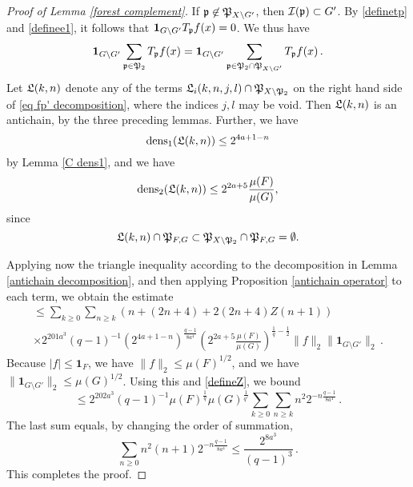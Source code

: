 {\begin{proof}[Proof of Lemma \ref{forest complement}]
    If $\mathfrak p \not\in \mathfrak P_{X \setminus G'}$, then $\mathcal{I}(\mathfrak p) \subset G'$. By \eqref{definetp} and \eqref{definee1}, it follows that
    $\mathbf{1}_{G \setminus G'} T_{\mathfrak p}f(x) = 0$. We thus have
    $$
        \mathbf{1}_{G\setminus G'} \sum_{\mathfrak p \in \mathfrak P_2} T_{\mathfrak p}f(x) = \mathbf{1}_{G\setminus G'} \sum_{\mathfrak p \in \mathfrak P_2 \cap \mathfrak P_{X \setminus G'}} T_{\mathfrak p}f(x)\,.
    $$
    Let $\mathfrak L(k,n)$ denote any of the terms $\mathfrak L_i(k,n,j,l) \cap \mathfrak P_{X \setminus \mathfrak P_2}$ on the right hand side of \eqref{eq fp' decomposition}, where the indices $j, l$ may be void. Then $\mathfrak L(k,n)$ is an antichain, by the three preceding lemmas. Further, we have
    \begin{equation*}
    \operatorname{\operatorname{dens}}_1(\mathfrak L(k,n)) \le 2^{4a+1 - n}
    \end{equation*}
    by Lemma \ref{C dens1}, and we have
    \begin{equation*}
     \operatorname{\operatorname{dens}}_2(\mathfrak L(k,n)) \le 2^{2a+5} \frac{\mu(F)}{\mu(G)},
     \end{equation*}
     since
     \begin{equation*}
     \mathfrak L(k,n) \cap \mathfrak P_{F,G} \subset \mathfrak P_{X \setminus \mathfrak P_2} \cap \mathfrak P_{F, G} = \emptyset.
     \end{equation*}

    Applying now the triangle inequality according to the decomposition in Lemma \ref{antichain decomposition}, and then applying Proposition \ref{antichain operator} to each term, we obtain the estimate
    \begin{multline*}
        \le \sum_{k \ge 0} \sum_{n \ge k} (n + (2n+4) + 2(2n+4) Z(n+1)) \\
        \times 2^{201a^3}(q-1)^{-1} (2^{4a+1-n})^{\frac{q-1}{8a^4}} (2^{2a+5} \frac{\mu(F)}{\mu(G)})^{\frac{1}{q} - \frac{1}{2}} \|f\|_2\|\mathbf{1}_{G\setminus G'}\|_2\,.
    \end{multline*}
    Because $|f| \le \mathbf{1}_F$, we have $\|f\|_2 \le \mu(F)^{1/2}$, and we have $\|\mathbf{1}_{G\setminus G'}\|_2 \le \mu(G)^{1/2}$. Using this and \eqref{defineZ}, we bound
    $$
        \le 2^{202a^3} (q - 1)^{-1} \mu(F)^{\frac{1}{q}} \mu(G)^{\frac{1}{q'}}  \sum_{k \ge 0} \sum_{n \ge k} n^2 2^{-n\frac{q-1}{8a^4}}\,.
    $$
    The last sum equals, by changing the order of summation,
    $$
        \sum_{n \ge 0} n^2(n+1) 2^{-n\frac{q-1}{8a^4}} \le \frac{2^{8a^3}}{(q-1)^3}\,.
    $$
    This completes the proof.
\end{proof}

}

